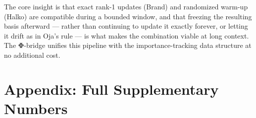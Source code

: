 \documentclass{article}
\let\PhiSymbol\Phi
\renewcommand{\Phi}{\boldsymbol{\PhiSymbol}}
\begin{document}
The core insight is that exact rank-1 updates (Brand) and randomized warm-up
(Halko) are compatible during a bounded window, and that freezing the
resulting basis afterward --- rather than continuing to update it exactly
forever, or letting it drift as in Oja's rule --- is what makes the
combination viable at long context.  The $\Phi$-bridge unifies this
pipeline with the importance-tracking data structure at no additional cost.

\small



\appendix
\enlargethispage{8\baselineskip}
\section{Appendix: Full Supplementary Numbers}
\label{app:multihead}
\label{app:memory}
\label{app:longctx}
\label{app:ppl}
\label{app:decode}
\label{app:importance}
\label{app:attn}
\end{document}

